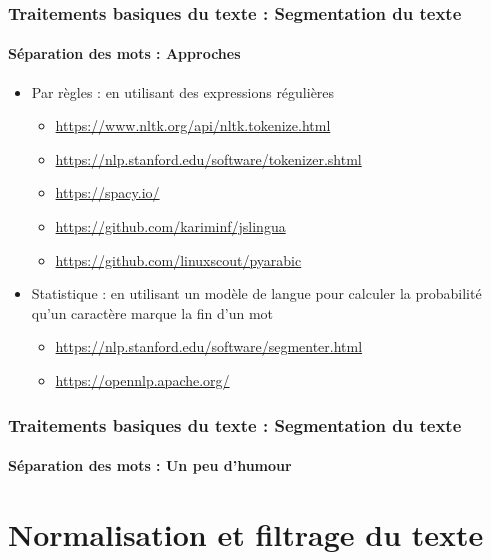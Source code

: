 \documentclass[xcolor=table]{beamer}
\begin{document}
\begin{frame}
\frametitle{Traitements basiques du texte : Segmentation du texte}
\framesubtitle{Séparation des mots : Approches}

\begin{itemize}
	\item Par règles : en utilisant des expressions régulières 
	\begin{itemize}
		\item \url{https://www.nltk.org/api/nltk.tokenize.html}
		\item \url{https://nlp.stanford.edu/software/tokenizer.shtml}
		\item \url{https://spacy.io/}
		\item \url{https://github.com/kariminf/jslingua}
		\item \url{https://github.com/linuxscout/pyarabic}
	\end{itemize}
	\item Statistique : en utilisant un modèle de langue pour calculer la probabilité qu'un caractère marque la  fin d'un mot 
	\begin{itemize}
		\item \url{https://nlp.stanford.edu/software/segmenter.html}
		\item \url{https://opennlp.apache.org/}
	\end{itemize}
\end{itemize}

\end{frame}

\begin{frame}
\frametitle{Traitements basiques du texte : Segmentation du texte}
\framesubtitle{Séparation des mots : Un peu d'humour} 

\begin{center}
\end{center}

\end{frame}


\section{Normalisation et filtrage du texte}
\end{document}
